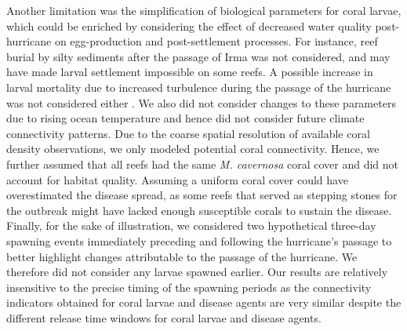 \documentclass[fleqn,10pt]{wlscirep}
\newcommand{\modif}[1]{{#1}}
\begin{document}
Another limitation was the simplification of biological parameters for coral larvae, which could be enriched by considering the effect of decreased water quality post-hurricane on egg-production and post-settlement processes. \modif{For instance, reef burial by silty sediments after the passage of Irma was not considered, and may have made larval settlement impossible on some reefs}. A possible increase in larval mortality due to increased turbulence during the passage of the hurricane was not considered either \citep{heyward2012}. We also did not consider changes to these parameters due to rising ocean temperature and hence did not consider future climate connectivity patterns.  Due to \modif{the coarse spatial resolution of available coral density observations, we only modeled potential coral connectivity. Hence, we} further assumed that all reefs had the same \emph{M. cavernosa} coral cover and did not account for habitat quality. \modif{Assuming a uniform coral cover could have overestimated the disease spread, as some reefs that served as stepping stones for the outbreak might have lacked enough susceptible corals to sustain the disease.} Finally, for the sake of illustration, we considered two hypothetical three-day spawning events immediately preceding and following the hurricane's passage to better highlight changes attributable to the passage of the hurricane. We therefore did not consider any larvae spawned earlier. Our results are relatively insensitive to the precise timing of the spawning periods as the connectivity indicators obtained for coral larvae and disease agents are very similar despite the different release time windows for coral larvae and disease agents.
\end{document}
